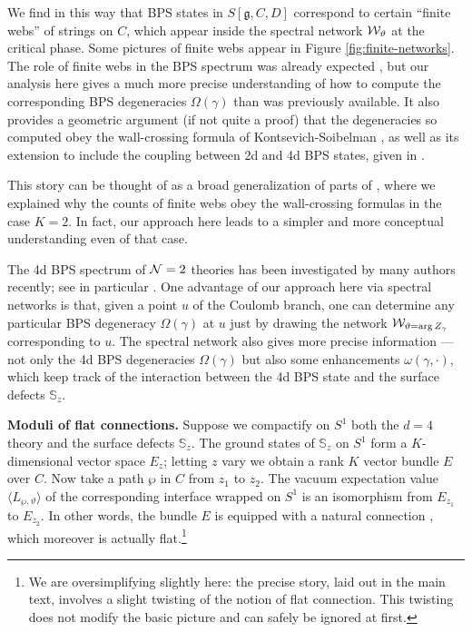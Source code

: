 \documentclass[11pt,a4paper]{article}
\def\fg{\mathfrak{g}}
\def\wnet {{\cal W}}
\def\fg{\mathfrak{g}}
\def\wnet {{\cal W}}
\newcommand{\inprod}[1]{\langle#1\rangle}
\newcommand\N{{\cal N}}
\newcommand{\bS}{\mathbb S}
\begin{document}
We find in this way that BPS states in $S[ \fg,C,D]$ correspond to certain ``finite webs'' of
strings on $C$, which appear inside the spectral network $\wnet_\vartheta$ at the critical phase.
Some pictures of finite webs appear in Figure \ref{fig:finite-networks}.
The role of finite webs in the BPS spectrum was already expected
\cite{Klemm:1996bj,Brandhuber:1996xk,Aharony:1997bh,Gaiotto:2009hg}, but our analysis here
gives a much more precise understanding of how to compute the corresponding BPS degeneracies
$\Omega(\gamma)$ than was previously available.
It also provides a geometric argument (if not quite a proof) that the degeneracies so computed obey the
wall-crossing formula
of Kontsevich-Soibelman \cite{ks1}, as well as its extension to include the coupling between
2d and 4d BPS states, given in \cite{Gaiotto:2011tf}.

This story can be thought of as a broad generalization of
parts of \cite{Gaiotto:2009hg,Gaiotto:2011tf}, where we explained why the counts of finite webs
obey the wall-crossing formulas in the case $K=2$.
In fact, our approach here leads to a simpler and more conceptual understanding
even of that case.

The 4d BPS spectrum of $\N=2$ theories has been investigated by many authors recently; see in particular
\cite{Alim:2011ae,Alim2011a}.
One advantage of our approach here via spectral networks
is that, given a point $u$ of the Coulomb branch,
one can determine any particular BPS degeneracy $\Omega(\gamma)$ at $u$ just by drawing
the network $\wnet_{\vartheta = \arg Z_\gamma}$ corresponding to $u$.
The spectral network also gives more precise information ---
not only the 4d BPS degeneracies $\Omega(\gamma)$ but also some enhancements
$\omega(\gamma, \cdot)$,
which keep track of the interaction between the 4d BPS state and the surface defects
$\bS_z$.

\smallskip
{\bf Moduli of flat connections.}
Suppose we compactify on $S^1$ both the $d=4$ theory and the surface defects $\bS_z$.
The ground states of $\bS_z$ on $S^1$ form a $K$-dimensional vector space $E_z$;
letting $z$ vary we obtain
a rank $K$ vector bundle $E$ over $C$.
Now take a path $\wp$ in $C$ from $z_1$ to $z_2$.
The vacuum expectation value $\inprod{L_{\wp,\vartheta}}$ of the corresponding
interface wrapped on $S^1$ is an isomorphism from $E_{z_1}$ to $E_{z_2}$.
In other words, the bundle $E$ is equipped with a natural connection \cite{Gaiotto:2009fs},
which moreover is actually flat.\footnote{We are oversimplifying slightly here: the precise story,
laid out in the main text,
involves a slight twisting of the notion of flat connection.  This twisting
does not modify the basic picture and can safely be ignored at first.}
\end{document}

